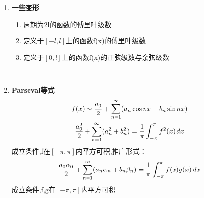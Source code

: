 \documentclass[12pt]{scrartcl}
\begin{document}
{\begin{enumerate}
\begin{enumerate}
\begin{gather}
            a_0=0 \notag\\
            a_n=0 \notag\\
            b_n=\frac{2}{\pi}\int_{0}^{\pi}f(x) \sin{nx} \,dx \notag
        \end{gather}
        正弦级数为$ \sum_{n = 1}^{\infty} b_n \sin nx  $
        \item 偶延拓展成余弦级数
        \begin{gather}
            a_0=\frac{2}{\pi}\int_{0}^{\pi}f(x) \,dx \notag\\
            a_n=\frac{2}{\pi}\int_{0}^{\pi}f(x)\cos nx \,dx \notag\\
            b_n=0 \notag\\
        \end{gather}
        余弦级数为$ \frac{a_0}{2}+\sum_{n = 1}^{\infty} a_n \cos nx  $
    \end{enumerate}
    \newpage
    \item  \textbf{一些变形}
    \begin{enumerate}
        \item 周期为2l的函数的傅里叶级数
        \item 定义于$[-l,l]$上的函数f(x)的傅里叶级数
        \item 定义于$[0,l]$上的函数f(x)的正弦级数与余弦级数
    \end{enumerate}
~\\
    \item \textbf{Parseval等式}\\
    \begin{gather}
        f(x)\sim \frac{a_0}{2}+\sum_{n = 1}^{\infty} (a_n \cos nx+b_n\sin nx)  \notag\\
        \frac{a_0^2}{2}+\sum_{n = 1}^{\infty} (a_n^2+b_n^2)= \frac{1}{\pi}\int_{-\pi}^{\pi}f^2(x)  \,dx   \notag
    \end{gather}
    成立条件,f在$[-\pi,\pi]$内平方可积,推广形式：
    \begin{gather}
        \frac{a_0\alpha _0}{2}+\sum_{n = 1}^{\infty} (a_n\alpha _n+b_n\beta _n)= \frac{1}{\pi}\int_{-\pi}^{\pi}f(x)g(x)  \,dx   \notag
    \end{gather}
    成立条件,f,g在$[-\pi,\pi]$内平方可积
\end{enumerate}

}
\end{document}
